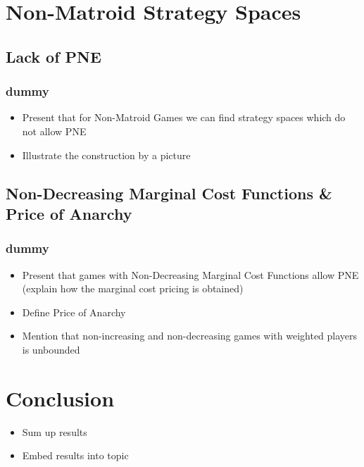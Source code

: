 \documentclass{beamer}
\newcommand{\ft}{\frametitle{dummy}}
\begin{document}
\section{Non-Matroid Strategy Spaces}
\subsection{Lack of PNE}
\begin{frame}
  \ft
  \begin{itemize}
    \item Present that for Non-Matroid Games we can find strategy spaces
      which do not allow PNE
    \item Illustrate the construction by a picture
  \end{itemize}
\end{frame}

\subsection{Non-Decreasing Marginal Cost Functions \& Price of Anarchy}
\begin{frame}
  \ft
  \begin{itemize}
    \item Present that games with Non-Decreasing Marginal Cost Functions allow
      PNE (explain how the marginal cost pricing is obtained)
    \item Define Price of Anarchy
    \item Mention that non-increasing and non-decreasing games with weighted
      players is unbounded
  \end{itemize}
\end{frame}

\section{Conclusion}
\begin{frame}
  \begin{itemize}
    \item Sum up results
    \item Embed results into topic
  \end{itemize}
\end{frame}
\end{document}
